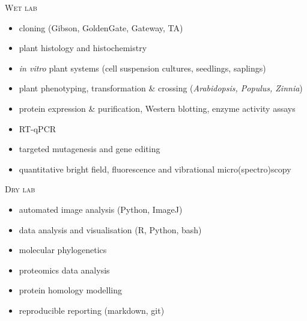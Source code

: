 \documentclass[11pt]{article}
\begin{document}
\textsc{\large{Wet lab}} 
\vspace{-0.175cm}
\begin{addmargin}[24pt]{0pt}
	\begin{multicols}{2}
		\raggedright
		\begin{itemize}[itemindent=-9pt,leftmargin=24pt]
			\itemsep-0.1cm
			\item cloning (Gibson, GoldenGate, Gateway, TA)
			\item plant histology and histochemistry
			\item \textit{in vitro} plant systems (cell suspension cultures, seedlings, saplings)
			\item plant phenotyping, transformation \& crossing (\textit{Arabidopsis, Populus, Zinnia})
			\item protein expression \& purification, Western blotting, enzyme activity assays
			\item RT-qPCR
			\item targeted mutagenesis and gene editing
			\item quantitative bright field, fluorescence and vibrational micro(spectro)scopy
		\end{itemize}
	\end{multicols}
\end{addmargin}
\vspace{0.2cm}

\textsc{\large{Dry lab}} 
\vspace{-0.175cm}
\begin{addmargin}[24pt]{0pt}
	\begin{multicols}{2}
		\raggedright
		\begin{itemize}[itemindent=-9pt,leftmargin=24pt]
			\itemsep-0.1cm
			\item automated image analysis (Python, ImageJ)
			\item data analysis and visualisation (R, Python, bash)
			\item molecular phylogenetics
			\item proteomics data analysis
			\item protein homology modelling
			\item reproducible reporting (markdown, git)
		\end{itemize}
	\end{multicols}
\end{addmargin}
\vspace{0.5cm}
\end{document}
